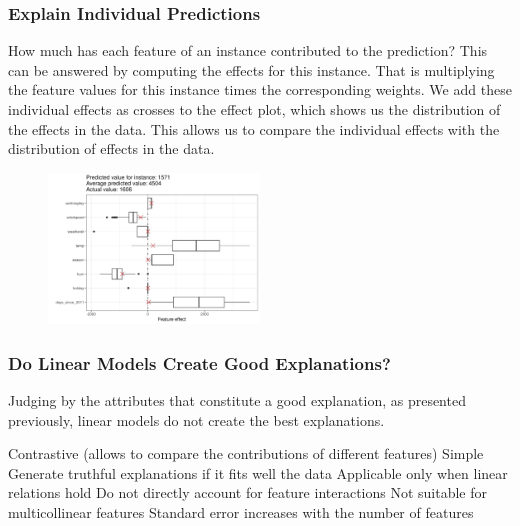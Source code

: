 \subsubsection{Explain Individual Predictions}
How much has each feature of an instance contributed to the prediction? 
This can be answered by computing the effects for this instance. That is multiplying the feature values for this instance times the corresponding weights.
We add these individual effects as crosses to the effect plot, which shows us the distribution of the effects in the data. This allows us to compare the individual effects with the distribution
of effects in the data.
\begin{figure}[H]
    \includegraphics[width=0.5\textwidth]{img/linear-effects-single-1.jpeg}
    \centering
\end{figure}
\subsubsection{Do Linear Models Create Good Explanations?}
Judging by the attributes that constitute a good explanation, as presented previously, linear models do not create the best explanations. 
\begin{itemize}[label={\ifgooditem\color{green}\else\color{red}\fi\textbullet}]
\gooditem Contrastive (allows to compare the contributions of different features)
\gooditem Simple
\gooditem Generate truthful explanations if it fits well the data
\baditem Applicable only when linear relations hold
\baditem Do not directly account for feature interactions
\baditem Not suitable for multicollinear features
\baditem Standard error increases with the number of features
\end{itemize}


